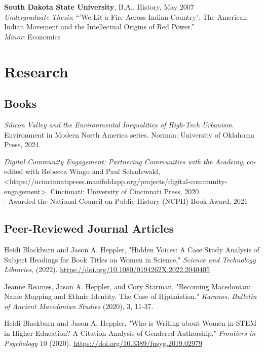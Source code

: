 \documentclass[10pt]{article}
\begin{document}
\textbf{South Dakota State University}, B.A., History, May 2007 \\
\textit{Undergraduate Thesis}: ``'We Lit a Fire Across Indian Country': The American Indian Movement and the Intellectual Origins of Red Power.'' \\
\textit{Minor}: Economics


\section*{Research}


\subsection*{Books}

\textit{Silicon Valley and the Environmental Inequalities of High-Tech Urbanism}. Environment in Modern North America series. Norman: University of Oklahoma Press, 2024.

\textit{Digital Community Engagement: Partnering Communities with the Academy}, co-edited with Rebecca Wingo and Paul Schadewald, <https://ucincinnatipress.manifoldapp.org/projects/digital-community-engagement>. Cincinnati: University of Cincinnati Press, 2020. \\
\quad $\cdot$ Awarded the National Council on Public History (NCPH) Book Award, 2021

\subsection*{Peer-Reviewed Journal Articles}\label{peer-reviewed}

Heidi Blackburn and Jason A. Heppler, "Hidden Voices: A Case Study Analysis of Subject Headings for Book Titles on Women in Science," \textit{Science and Technology Libraries}, (2022). \url{https://doi.org/10.1080/0194262X.2022.2040405}

Jeanne Reames, Jason A. Heppler, and Cory Starman, "Becoming Macedonian: Name Mapping and Ethnic Identity. The Case of Hjphaistion." \textit{Karanos. Bulletin of Ancient Macedonian Studies} (2020), 3, 11-37.

Heidi Blackburn and Jason A. Heppler, "Who is Writing about Women in STEM in Higher Education? A Citation Analysis of Gendered Authorship," \textit{Frontiers in Psychology} 10 (2020). \url{https://doi.org/10.3389/fpsyg.2019.02979}
\end{document}
